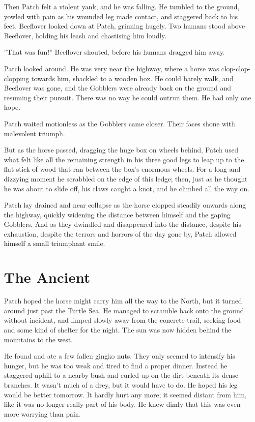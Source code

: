 \documentclass[12pt]{book}
\begin{document}
Then Patch felt a violent yank, and he was falling. He tumbled to the
ground, yowled with pain as his wounded leg made contact, and
staggered back to his feet. Beeflover looked down at Patch, grinning
hugely. Two humans stood above Beeflover, holding his leash and
chastising him loudly.

''That was fun!'' Beeflover shouted, before his humans dragged him
away.

Patch looked around. He was very near the highway, where a horse was
clop-clop-clopping towards him, shackled to a wooden box. He could
barely walk, and Beeflover was gone, and the Gobblers were already
back on the ground and resuming their pursuit. There was no way he
could outrun them. He had only one hope.

Patch waited motionless as the Gobblers came closer. Their faces shone
with malevolent triumph.

But as the horse passed, dragging the huge box on wheels behind, Patch
used what felt like all the remaining strength in his three good legs
to leap up to the flat stick of wood that ran between the box's
enormous wheels. For a long and dizzying moment he scrabbled on the
edge of this ledge; then, just as he thought he was about to slide
off, his claws caught a knot, and he climbed all the way on.

Patch lay drained and near collapse as the horse clopped steadily
onwards along the highway, quickly widening the distance between
himself and the gaping Gobblers. And as they dwindled and disappeared
into the distance, despite his exhaustion, despite the terrors and
horrors of the day gone by, Patch allowed himself a small triumphant
smile.


\section{The Ancient}

Patch hoped the horse might carry him all the way to the North, but it
turned around just past the Turtle Sea. He managed to scramble back
onto the ground without incident, and limped slowly away from the
concrete trail, seeking food and some kind of shelter for the
night. The sun was now hidden behind the mountains to the west.

He found and ate a few fallen gingko nuts. They only seemed to
intensify his hunger, but he was too weak and tired to find a proper
dinner. Instead he staggered uphill to a nearby bush and curled up on
the dirt beneath its dense branches. It wasn't much of a drey, but it
would have to do. He hoped his leg would be better tomorrow. It hardly
hurt any more; it seemed distant from him, like it was no longer
really part of his body. He knew dimly that this was even more
worrying than pain.
\end{document}
